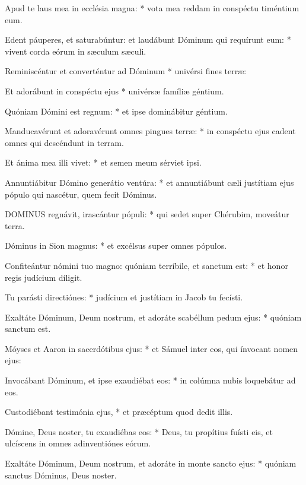 Apud te laus mea in ecclésia magna: * vota mea reddam in conspéctu timéntium eum.

Edent páuperes, et saturabúntur: et laudábunt Dóminum qui requírunt eum: * vivent corda eórum in sæculum sæculi.

Reminiscéntur et converténtur ad Dóminum * univérsi fines terræ:

Et adorábunt in conspéctu ejus * univérsæ famíliæ géntium.

Quóniam Dómini est regnum: * et ipse dominábitur géntium.

Manducavérunt et adoravérunt omnes pingues terræ: * in conspéctu ejus cadent omnes qui descéndunt in terram.

Et ánima mea illi vivet: * et semen meum sérviet ipsi.

Annuntiábitur Dómino generátio ventúra: * et annuntiábunt cæli justítiam ejus pópulo qui nascétur, quem fecit Dóminus.



\lettrine[lines=2]{D}{OMINUS} regnávit, irascántur pópuli: * qui sedet super Chérubim, moveátur terra.

Dóminus in Sion magnus: * et excélsus super omnes pópulos.

Confiteántur nómini tuo magno: quóniam terríbile, et sanctum est: * et honor regis judícium díligit.

Tu parásti directiónes: * judícium et justítiam in Jacob tu fecísti.

Exaltáte Dóminum, Deum nostrum, et adoráte scabéllum pedum ejus: * quóniam sanctum est.

Móyses et Aaron in sacerdótibus ejus: * et Sámuel inter eos, qui ínvocant nomen ejus:

Invocábant Dóminum, et ipse exaudiébat eos: * in colúmna nubis loquebátur ad eos.

Custodiébant testimónia ejus, * et præcéptum quod dedit illis.

Dómine, Deus noster, tu exaudiébas eos: * Deus, tu propítius fuísti eis, et ulcíscens in omnes adinventiónes eórum.

Exaltáte Dóminum, Deum nostrum, et adoráte in monte sancto ejus: * quóniam sanctus Dóminus, Deus noster.


